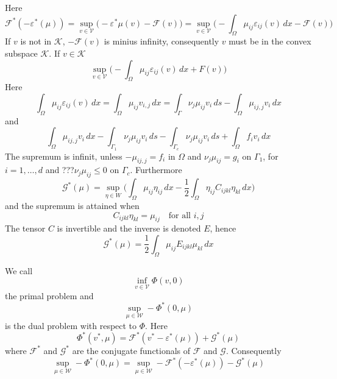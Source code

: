 \documentclass[12pt,a4paper]{article}
\numberwithin{equation}{section}
\numberwithin{table}{section}
\numberwithin{figure}{section}
\newcommand{\W}{\ensuremath{\mathcal{W}}}
\newcommand{\half}{\ensuremath{\frac{1}{2}}}
\newcommand{\V}{\ensuremath{\mathcal{V}}}
\newcommand{\K}{\ensuremath{\mathcal{K}}}
\newcommand{\F}{\ensuremath{{\mathcal F}}}
\newcommand{\G}{\ensuremath{{\mathcal G}}}
\newcommand{\intO}{\int_\Omega\!\!}
\newcommand{\intG}[1][0]{\int_{\Gamma_{#1}}\!\!}
\renewcommand{\epsilon}{\varepsilon}
\newcommand{\strain}[1][]{\ensuremath{\epsilon_{#1}}}
\newcommand{\epsij}{\strain[ij]}
\newcommand{\infvinV}{\ensuremath{\inf_{v\in \V}}}
\newcommand{\dx}{{\,dx}}
\newcommand{\ds}{{\,ds}}
\begin{document}
Here
\begin{equation}
  \F^*(-\strain^*(\mu)) = \sup_{v \in \V} \bigl(-\strain^* \mu(v)
   - \F(v)\bigr)
  = \sup_{v\in \V} \bigl(-\intO \mu_{ij}\epsij(v) \dx - \F(v) \bigr)
\end{equation}
If $v$ is not in $\K$, $-\F(v)$ is minius infinity, consequently $v$ must be in the convex subspace $\K$. If $v\in \K$
\begin{equation}
  \sup_{v\in\V} \bigl(-\intO \mu_{ij}\epsij(v) \dx + F(v) \bigr)
\end{equation}
Here
\begin{equation}
  \intO \mu_{ij} \epsij(v) \dx = \intO \mu_{ij} v_{i,j} \dx
  = \int_\Gamma \nu_j \mu_{ij} v_i \ds - \intO \mu_{ij,j} v_i \dx
\end{equation}
and
\begin{equation}
  \intO \mu_{ij,j} v_i \dx - \intG[1] \nu_j \mu_{ij} v_i \ds 
  - \intG[c] \nu_j \mu_{ij} v_i \ds + \intO f_i v_i \dx
\end{equation}
The supremum is infinit, unless $-\mu_{ij,j} = f_i$ in $\Omega$ and $\nu_j \mu_{ij} = g_i$ on $\Gamma_1$, for $i=1,\ldots,d$ and ???$\nu_j \mu_{ij} \le 0$ on $\Gamma_c$.
Furthermore
\begin{equation}
  \G^*(\mu) = \sup_{\eta\in W} \bigl(\intO \mu_{ij} \eta_{ij} \dx
   - \half \intO \eta_{ij} C_{ijkl} \eta_{kl} \dx \bigr)
\end{equation}
and the supremum is attained when
\begin{equation}
  C_{ijkl} \eta_{kl} = \mu_{ij} \quad\text{for all $i,j$}
\end{equation}
The tensor $C$ is invertible and the inverse is denoted $E$, hence
\begin{equation}
  \G^*(\mu) = \half \intO \mu_{ij} E_{ijkl} \mu_{kl} \dx
\end{equation}

We call
\begin{equation}
  \infvinV \varPhi(v, 0)
\end{equation}
the primal problem and
\begin{equation}
  \sup_{\mu\in \W} -\varPhi^*(0,\mu)
\end{equation}
is the dual problem with respect to $\varPhi$.  Here
\begin{equation}
  \varPhi^*(v^*,\mu) = \F^*(v^*-\epsilon^*(\mu)) + \G^*(\mu)
\end{equation}
where $\F^*$ and $\G^*$ are the conjugate functionals of $\F$ and $\G$.  Consequently
\begin{equation}
  \sup_{\mu\in \W} -\varPhi^*(0,\mu)
  = \sup_{\mu\in \W} -\F^*(-\epsilon^*(\mu)) - \G^*(\mu)
\end{equation}
\end{document}
